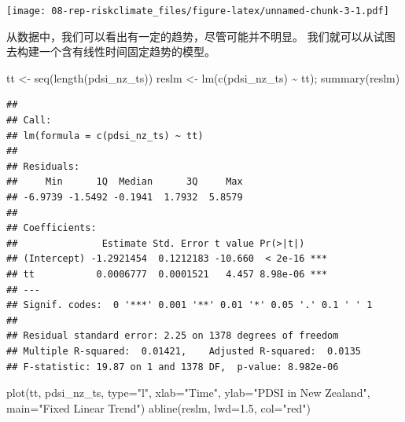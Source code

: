 \documentclass[
  oneside]{book}
\newenvironment{Shaded}{\begin{snugshade}}{\end{snugshade}}
\newcommand{\AttributeTok}[1]{\textcolor[rgb]{0.77,0.63,0.00}{#1}}
\newcommand{\DecValTok}[1]{\textcolor[rgb]{0.00,0.00,0.81}{#1}}
\newcommand{\FloatTok}[1]{\textcolor[rgb]{0.00,0.00,0.81}{#1}}
\newcommand{\FunctionTok}[1]{\textcolor[rgb]{0.00,0.00,0.00}{#1}}
\newcommand{\NormalTok}[1]{#1}
\newcommand{\OtherTok}[1]{\textcolor[rgb]{0.56,0.35,0.01}{#1}}
\newcommand{\SpecialCharTok}[1]{\textcolor[rgb]{0.00,0.00,0.00}{#1}}
\newcommand{\StringTok}[1]{\textcolor[rgb]{0.31,0.60,0.02}{#1}}
\begin{document}
\begin{Shaded}
\end{Shaded}

\texttt{[image: 08-rep-riskclimate\_files/figure-latex/unnamed-chunk-3-1.pdf]}

从数据中，我们可以看出有一定的趋势，尽管可能并不明显。
我们就可以从试图去构建一个含有线性时间固定趋势的模型。

\begin{Shaded}
\begin{Highlighting}[]
\NormalTok{tt }\OtherTok{\textless{}{-}} \FunctionTok{seq}\NormalTok{(}\FunctionTok{length}\NormalTok{(pdsi\_nz\_ts))}
\NormalTok{reslm }\OtherTok{\textless{}{-}} \FunctionTok{lm}\NormalTok{(}\FunctionTok{c}\NormalTok{(pdsi\_nz\_ts) }\SpecialCharTok{\textasciitilde{}}\NormalTok{ tt); }\FunctionTok{summary}\NormalTok{(reslm)}
\end{Highlighting}
\end{Shaded}

\begin{verbatim}
## 
## Call:
## lm(formula = c(pdsi_nz_ts) ~ tt)
## 
## Residuals:
##     Min      1Q  Median      3Q     Max 
## -6.9739 -1.5492 -0.1941  1.7932  5.8579 
## 
## Coefficients:
##               Estimate Std. Error t value Pr(>|t|)    
## (Intercept) -1.2921454  0.1212183 -10.660  < 2e-16 ***
## tt           0.0006777  0.0001521   4.457 8.98e-06 ***
## ---
## Signif. codes:  0 '***' 0.001 '**' 0.01 '*' 0.05 '.' 0.1 ' ' 1
## 
## Residual standard error: 2.25 on 1378 degrees of freedom
## Multiple R-squared:  0.01421,    Adjusted R-squared:  0.0135 
## F-statistic: 19.87 on 1 and 1378 DF,  p-value: 8.982e-06
\end{verbatim}

\begin{Shaded}
\begin{Highlighting}[]
\FunctionTok{plot}\NormalTok{(tt, pdsi\_nz\_ts, }\AttributeTok{type=}\StringTok{"l"}\NormalTok{, }\AttributeTok{xlab=}\StringTok{"Time"}\NormalTok{, }\AttributeTok{ylab=}\StringTok{"PDSI in New Zealand"}\NormalTok{, }\AttributeTok{main=}\StringTok{"Fixed Linear Trend"}\NormalTok{)}
\FunctionTok{abline}\NormalTok{(reslm, }\AttributeTok{lwd=}\FloatTok{1.5}\NormalTok{, }\AttributeTok{col=}\StringTok{"red"}\NormalTok{)}
\end{Highlighting}
\end{Shaded}
\end{document}
